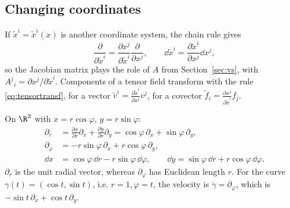 \subsection{Changing coordinates}\label{sec:changecoords}
If $\tilde x^i=\tilde x^i(x)$ is another coordinate system, the chain rule gives
\begin{equation}\label{eq:basistransf}
\frac{\partial}{\partial\tilde x^i}=\frac{\partial x^j}{\partial\tilde x^i}\frac{\partial}{\partial x^j},\qquad
\dd\tilde x^i=\frac{\partial\tilde x^i}{\partial x^j}\dd x^j,
\end{equation}
so the Jacobian matrix plays the role of $A$ from Section~\ref{sec:vs}, with $A^j{}_i=\partial x^j/\partial\tilde x^i$. Components of a tensor field transform with the rule \eqref{eq:tensortransf}, \eg for a vector $\tilde v^i=\frac{\partial\tilde x^i}{\partial x^j}v^j$, for a covector $\tilde f_i=\frac{\partial x^j}{\partial\tilde x^i}f_j$.

\begin{example}\label{ex:polarbasis}
On $\R^2$ with $x=r\cos\varphi$, $y=r\sin\varphi$:
\begin{align*}
\partial_r&=\frac{\partial x}{\partial r}\partial_x+\frac{\partial y}{\partial r}\partial_y=\cos\varphi\,\partial_x+\sin\varphi\,\partial_y,\\
\partial_\varphi&=-r\sin\varphi\,\partial_x+r\cos\varphi\,\partial_y,\\
\dd x&=\cos\varphi\,\dd r-r\sin\varphi\,\dd\varphi,\qquad \dd y=\sin\varphi\,\dd r+r\cos\varphi\,\dd\varphi .
\end{align*}
$\partial_r$ is the unit radial vector, whereas $\partial_\varphi$ has Euclidean length $r$. For the curve $\gamma(t)=(\cos t,\sin t)$, i.e. $r=1,\varphi=t$, the velocity is $\dot\gamma=\partial_\varphi$, which is $-\sin t\,\partial_x+\cos t\,\partial_y$. \checkmark
\end{example}


